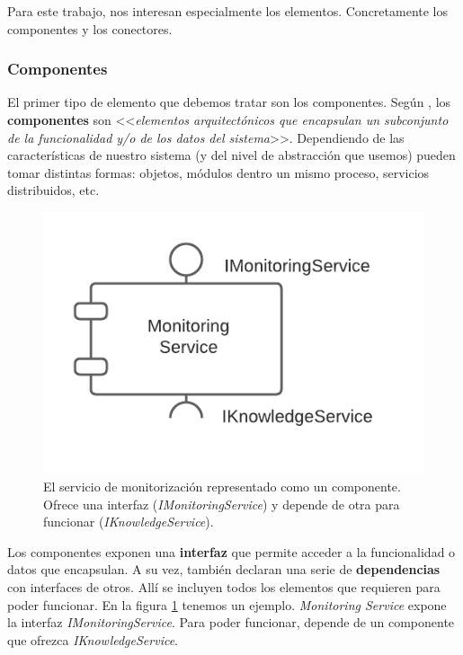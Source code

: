 Para este trabajo, nos interesan especialmente los elementos. Concretamente los componentes y los conectores.

\subsubsection{Componentes}

El primer tipo de elemento que debemos tratar son los componentes. Según \cite{taylorSoftwareArchitectureFoundations2009}, los \textbf{componentes} son <<\emph{elementos arquitectónicos que encapsulan un subconjunto de la funcionalidad y/o de los datos del sistema}>>. Dependiendo de las características de nuestro sistema (y del nivel de abstracción que usemos) pueden tomar distintas formas: objetos, módulos dentro un mismo proceso, servicios distribuidos, etc.

\begin{figure}
  \centering
  \includegraphics[scale=0.8]{cap_contexto_tecnologico/images/componente-ejemplo}
  \caption{El servicio de monitorización representado como un componente. Ofrece una interfaz (\emph{IMonitoringService}) y depende de otra para funcionar (\emph{IKnowledgeService}).}
  \label{fig:componenteEjemplo}
\end{figure}

Los componentes exponen una \textbf{interfaz} que permite acceder a la funcionalidad o datos que encapsulan. A su vez, también declaran una serie de \textbf{dependencias} con interfaces de otros. Allí se incluyen todos los elementos que requieren para poder funcionar. En la figura \ref{fig:componenteEjemplo} tenemos un ejemplo. \emph{Monitoring Service} expone la interfaz \emph{IMonitoringService}. Para poder funcionar, depende de un componente que ofrezca \emph{IKnowledgeService}.

